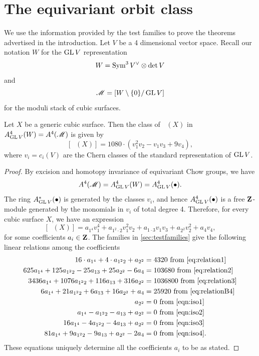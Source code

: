 \documentclass[12pt,reqno]{amsart}
\DeclareMathOperator{\Orb}{\overline{Orb}}
\numberwithin{equation}{section}
\begin{document}
\section{The equivariant orbit class}
We use the information provided by the test families to prove the theorems advertised in the introduction.
Let $V$ be a 4 dimensional vector space.
Recall our notation $W$ for the $\operatorname{GL} V$ representation 
\[W = \operatorname{Sym}^3V^\vee \otimes \det V\]
and
\[\mathscr M = \left[ W \setminus \{0\} / \operatorname{GL} V \right]\]
for the moduli stack of cubic surfaces.
\begin{theorem}\label{thm:eqvclass}
  Let $X$ be a generic cubic surface.
  Then the class of $\Orb(X)$ in $A^4_{\operatorname{GL} V}(W) = A^4(\mathscr M)$ is given by
  \[
    [\Orb(X)] = 1080 \cdot \left(v_{1}^{2}v_{2} - v_{1}v_{3}+ 9v_{4}\right),
  \]
  where $v_i = c_i(V)$ are the Chern classes of the standard representation of $\operatorname{GL} V$.
\end{theorem}
\begin{proof}
  By excision and homotopy invariance of equivariant Chow groups, we have
  \[ A^4(\mathscr M) = A^4_{\operatorname{GL} V}(W) = A^4_{\operatorname{GL} V}(\bullet).\]
  The ring $A^*_{\operatorname{GL} V}(\bullet)$ is generated by the classes $v_i$, and hence $A^4_{\operatorname{GL} V}(\bullet)$ is a free ${\bf Z}$-module generated by the monomials in $v_i$ of total degree 4.
  Therefore, for every cubic surface $X$, we have an expression
  \[[\Orb(X)] = a_{1^4}v_1^4 + a_{1^2\cdot 2} v_1^2v_2 + a_{1\cdot 3} v_1v_3 + a_{2^2}v_2^2 + a_4 v_4,\]
  for some coefficients $a_i \in {\bf Z}$.
  The families in \autoref{sec:testfamilies} give the following linear relations among the coefficients
  \begin{align*}
    16 \cdot a_{1^4} + 4 \cdot a_{1^2 2} + a_{2^2} &= 4320 \text{ from \eqref{eq:relation1}}\\
    625 a_{1^{4}} + 125 a_{1^{2}2} - 25a_{13} + 25a_{2^2} - 6 a_{4} &= 103680 \text{ from \eqref{eq:relation2}}\\
    3436a_{1^4} + 1076 a_{1^{2}2} +116 a_{13} + 316 a_{2^2} &= 1036800 \text{ from \eqref{eq:relation3}}\\
    6a_{1^{4}} + 21a_{1^{2}2}+6a_{13}+16a_{2^{2}}+a_{4} &= 25920 \text{ from \eqref{eq:relationB4}}\\
    a_{2^2} &= 0  \text{ from \eqref{eqn:iso1}}\\
    a_{1^4} - a_{1^2 2}- a_{13} +  a_{2^2}  &= 0  \text{ from \eqref{eqn:iso2}}\\
    16a_{1^4} -4a_{1^2 2}- 4a_{13} +  a_{2^2}  &= 0  \text{ from \eqref{eqn:iso3}}\\
    81a_{1^4} +9a_{1^2 2}- 9a_{13} +  a_{2^2}-2a_4  &= 0  \text{ from \eqref{eqn:iso4}}.
  \end{align*}
  These equations uniquely determine all the coefficients $a_i$ to be as stated.
\end{proof}
\end{document}
